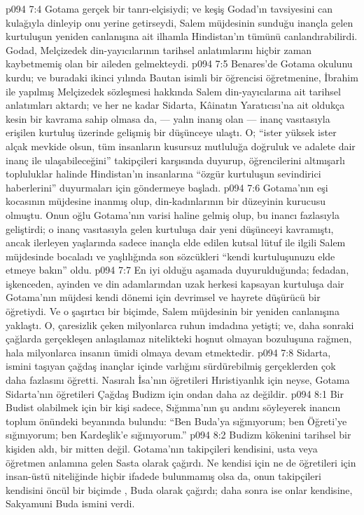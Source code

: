 \vs p094 7:4 Gotama gerçek bir tanrı\hyp{}elçisiydi; ve keşiş Godad’ın tavsiyesini can kulağıyla dinleyip onu yerine getirseydi, Salem müjdesinin sunduğu inançla gelen kurtuluşun yeniden canlanışına ait ilhamla Hindistan’ın tümünü canlandırabilirdi. Godad, Melçizedek din\hyp{}yayıcılarının tarihsel anlatımlarını hiçbir zaman kaybetmemiş olan bir aileden gelmekteydi.
\vs p094 7:5 Benares’de Gotama okulunu kurdu; ve buradaki ikinci yılında Bautan isimli bir öğrencisi öğretmenine, İbrahim ile yapılmış Melçizedek sözleşmesi hakkında Salem din\hyp{}yayıcılarına ait tarihsel anlatımları aktardı; ve her ne kadar Sidarta, Kâinatın Yaratıcısı’na ait oldukça kesin bir kavrama sahip olmasa da, --- yalın inanış olan --- inanç vasıtasıyla erişilen kurtuluş üzerinde gelişmiş bir düşünceye ulaştı. O; “ister yüksek ister alçak mevkide olsun, tüm insanların kusursuz mutluluğa doğruluk ve adalete dair inanç ile ulaşabileceğini” takipçileri karşısında duyurup, öğrencilerini altmışarlı topluluklar halinde Hindistan’ın insanlarına “özgür kurtuluşun sevindirici haberlerini” duyurmaları için göndermeye başladı.
\vs p094 7:6 Gotama’nın eşi kocasının müjdesine inanmış olup, din\hyp{}kadınlarının bir düzeyinin kurucusu olmuştu. Onun oğlu Gotama’nın varisi haline gelmiş olup, bu inancı fazlasıyla geliştirdi; o inanç vasıtasıyla gelen kurtuluşa dair yeni düşünceyi kavramıştı, ancak ilerleyen yaşlarında sadece inançla elde edilen kutsal lütuf ile ilgili Salem müjdesinde bocaladı ve yaşlılığında son sözcükleri “kendi kurtuluşunuzu elde etmeye bakın” oldu.
\vs p094 7:7 En iyi olduğu aşamada duyurulduğunda; fedadan, işkenceden, ayinden ve din adamlarından uzak herkesi kapsayan kurtuluşa dair Gotama’nın müjdesi kendi dönemi için devrimsel ve hayrete düşürücü bir öğretiydi. Ve o şaşırtıcı bir biçimde, Salem müjdesinin bir yeniden canlanışına yaklaştı. O, çaresizlik çeken milyonlarca ruhun imdadına yetişti; ve, daha sonraki çağlarda gerçekleşen anlaşılamaz nitelikteki hoşnut olmayan bozuluşuna rağmen, hala milyonlarca insanın ümidi olmaya devam etmektedir.
\vs p094 7:8 Sidarta, ismini taşıyan çağdaş inançlar içinde varlığını sürdürebilmiş gerçeklerden çok daha fazlasını öğretti. Nasıralı İsa’nın öğretileri Hıristiyanlık için neyse, Gotama Sidarta’nın öğretileri Çağdaş Budizm için ondan daha az değildir.
\vs p094 8:1 Bir Budist olabilmek için bir kişi sadece, Sığınma’nın şu andını söyleyerek inancın toplum önündeki beyanında bulundu: “Ben Buda’ya sığınıyorum; ben Öğreti’ye sığınıyorum; ben Kardeşlik’e sığınıyorum.”
\vs p094 8:2 Budizm kökenini tarihsel bir kişiden aldı, bir mitten değil. Gotama’nın takipçileri kendisini, usta veya öğretmen anlamına gelen Sasta olarak çağırdı. Ne kendisi için ne de öğretileri için insan\hyp{}üstü niteliğinde hiçbir ifadede bulunmamış olsa da, onun takipçileri kendisini öncül bir biçimde , Buda olarak çağırdı; daha sonra ise onlar kendisine, Sakyamuni Buda ismini verdi.
